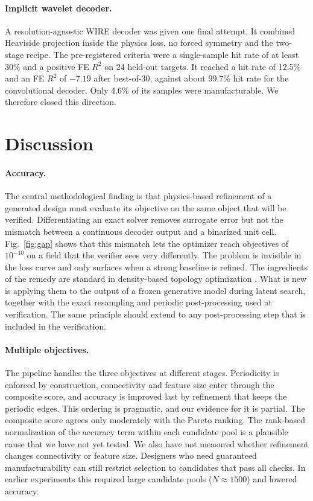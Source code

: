 \documentclass[a4paper,11pt]{article}
\newcommand{\RR}{R^2}
\begin{document}
\paragraph{Implicit wavelet decoder.}
A resolution-agnostic WIRE decoder \citep{saragadam2023wire} was given one
final attempt. It combined Heaviside projection inside the physics loss, no
forced symmetry and the two-stage recipe. The pre-registered criteria were a
single-sample hit rate of at least 30\% and a positive FE $\RR$ on 24
held-out targets. It reached a hit rate of 12.5\% and an FE $\RR$ of $-7.19$
after best-of-30, against about 99.7\% hit rate for the convolutional
decoder. Only 4.6\% of its samples were manufacturable. We therefore closed
this direction.

\section{Discussion}

\paragraph{Accuracy.}
The central methodological finding is that physics-based refinement of a
generated design must evaluate its objective on the same object that will be
verified. Differentiating an exact solver removes surrogate error but not the
mismatch between a continuous decoder output and a binarized unit cell.
Fig.~\ref{fig:gap} shows that this mismatch lets the optimizer reach
objectives of $10^{-10}$ on a field that the verifier sees very differently.
The problem is invisible in the loss curve and only surfaces when a strong
baseline is refined. The ingredients of the remedy are standard in
density-based topology optimization
\citep{guest2004achieving,wang2011projection}. What is new is applying them
to the output of a frozen generative model during latent search, together
with the exact resampling and periodic post-processing used at verification.
The same principle should extend to any post-processing step that is
included in the verification.

\paragraph{Multiple objectives.}
The pipeline handles the three objectives at different stages.
Periodicity is enforced by construction, connectivity and feature size enter
through the composite score, and accuracy is improved last by refinement
that keeps the periodic edges. This ordering is pragmatic, and our evidence
for it is partial. The composite score agrees only moderately with the
Pareto ranking. The rank-based normalization of the accuracy term within
each candidate pool is a plausible cause that we have not yet tested. We
also have not measured whether refinement changes connectivity or feature
size. Designers who need guaranteed manufacturability can still restrict
selection to candidates that pass all checks. In earlier experiments this
required large candidate pools ($N\approx1500$) and lowered accuracy.
\end{document}
